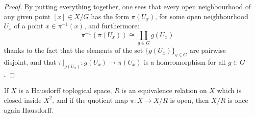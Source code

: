 \begin{proof}
                    By putting everything together, one sees that every open neighbourhood of any given point $[x] \in X/G$ has the form $\pi(U_x)$, for some open neighbourhood $U_x$ of a point $x \in \pi^{-1}(x)$, and furthermore:
                        $$\pi^{-1}(\pi(U_x)) \cong \coprod_{g \in G} g(U_x)$$
                    thanks to the fact that the elements of the set $\{g(U_x)\}_{g \in G}$ are pairwise disjoint, and that $\pi|_{g(U_x)}: g(U_x) \to \pi(U_x)$ is a homeomorphism for all $g \in G$.
                \end{proof}
            \begin{lemma} \label{lemma: hausdorff_quotient_criterion}
    	        If $X$ is a Hausdorff toplogical space, $R$ is an equivalence relation on $X$ which is closed inside $X^2$, and if the quotient map $\pi: X \to X/R$ is open, then $X/R$ is once again Hausdorff.
    	    \end{lemma}
